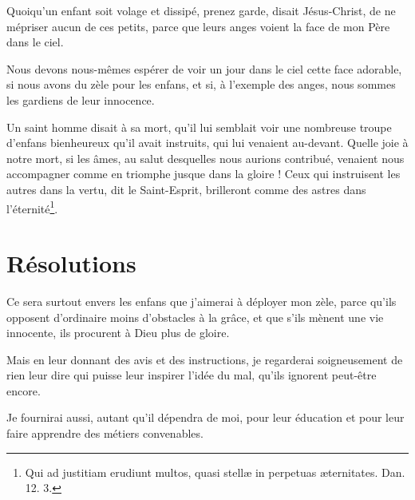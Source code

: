 \documentclass[instructions.tex]{subfiles}
\begin{document}
Quoiqu’un enfant soit volage et dissipé, prenez garde, disait Jésus-Christ, de ne mépriser aucun de ces petits, parce que leurs anges voient la face de mon Père dans le ciel.
 
Nous devons nous-mêmes espérer de voir un jour dans le ciel cette face adorable, si nous avons du zèle pour les enfans, et si, à l’exemple des anges, nous sommes les gardiens de leur innocence.
 
Un saint homme disait à sa mort, qu’il lui semblait voir une nombreuse troupe d’enfans bienheureux qu’il avait instruits, qui lui venaient au-devant. Quelle joie à notre mort, si les âmes, au salut desquelles nous aurions contribué, venaient nous accompagner comme en triomphe jusque dans la gloire ! Ceux qui instruisent les autres dans la vertu, dit le Saint-Esprit, brilleront comme des astres dans l’éternité\footnote{Qui ad justitiam erudiunt multos, quasi stellæ in perpetuas æternitates. Dan. 12. 3.}.
 
\section{Résolutions}
 
\primo Ce sera surtout envers les enfans que j’aimerai à déployer mon zèle, parce qu’ils opposent d’ordinaire moins d’obstacles à la grâce, et que s’ils mènent une vie innocente, ils procurent à Dieu plus de gloire.
 
\secundo Mais en leur donnant des avis et des instructions, je regarderai soigneusement de rien leur dire qui puisse leur inspirer l’idée du mal, qu’ils ignorent peut-être encore.
 
\tertio Je fournirai aussi, autant qu’il dépendra de moi, pour leur éducation et pour leur faire apprendre des métiers convenables. 

 
\end{document}
